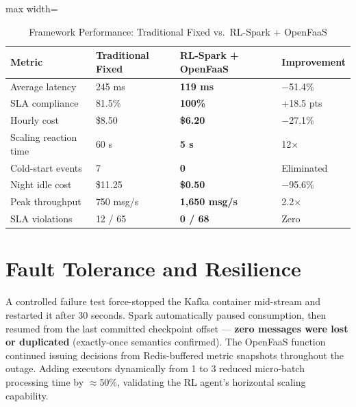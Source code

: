 \begin{table}[H]
\centering
\caption{Framework Performance: Traditional Fixed vs.\ RL-Spark + OpenFaaS}
\label{tab:rl_vs_fixed}
{\scriptsize
\setlength{\tabcolsep}{4pt}
\begin{adjustbox}{max width=\textwidth}
\begin{tabular}{@{}p{3.3cm}p{2.5cm}p{3.0cm}p{2.0cm}@{}}
\toprule
\textbf{Metric} & \textbf{Traditional Fixed} & \textbf{RL-Spark + OpenFaaS} & \textbf{Improvement} \\
\midrule
Average latency       & 245 ms        & \textbf{119 ms}       & $-$51.4\% \\
SLA compliance        & 81.5\%        & \textbf{100\%}        & +18.5 pts \\
Hourly cost           & \$8.50        & \textbf{\$6.20}       & $-$27.1\% \\
Scaling reaction time & 60 s          & \textbf{5 s}          & 12$\times$ \\
Cold-start events     & 7             & \textbf{0}            & Eliminated \\
Night idle cost       & \$11.25       & \textbf{\$0.50}       & $-$95.6\% \\
Peak throughput       & 750 msg/s     & \textbf{1,650 msg/s}  & 2.2$\times$ \\
SLA violations        & 12 / 65       & \textbf{0 / 68}       & Zero \\
\bottomrule
\end{tabular}
\end{adjustbox}
}
\end{table}

\section{Fault Tolerance and Resilience}
\label{sec:fault}
A controlled failure test force-stopped the Kafka container mid-stream and restarted it
after 30 seconds. Spark automatically paused consumption, then resumed from the last
committed checkpoint offset — \textbf{zero messages were lost or duplicated}
(exactly-once semantics confirmed). The OpenFaaS function continued issuing decisions
from Redis-buffered metric snapshots throughout the outage. Adding executors dynamically
from 1 to 3 reduced micro-batch processing time by $\approx$50\%, validating the RL
agent's horizontal scaling capability.

